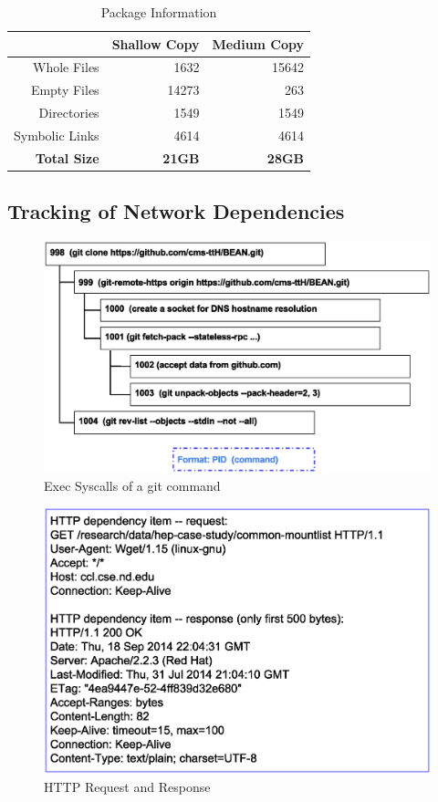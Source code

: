 \begin{table}
    \centering
    \begin{tabular}{rrr}
\hline
                    & \bf Shallow Copy & \bf Medium Copy\\
\hline
    Whole Files    & 1632         & 15642\\ 
\hline
    Empty Files    & 14273        & 263\\
\hline
    Directories    & 1549         & 1549\\ 
\hline
    Symbolic Links & 4614         & 4614 \\
\hline
    \bf Total Size & \bf 21GB     & \bf 28GB \\ 
\hline
    \end{tabular}
    \caption{Package Information}
    \label{table:package-info}
\end{table}

\subsection{Tracking of Network Dependencies}

\begin{figure}
\centering
\includegraphics[width=.6\textwidth]{git-syscall.eps}
\caption{Exec Syscalls of a git command}
\label{fig:git-syscall}
\end{figure}

\begin{figure}
\centering
\includegraphics[width=.6\textwidth]{http_packet.eps}
\caption{HTTP Request and Response}
\label{fig:http_packet}
\end{figure}

